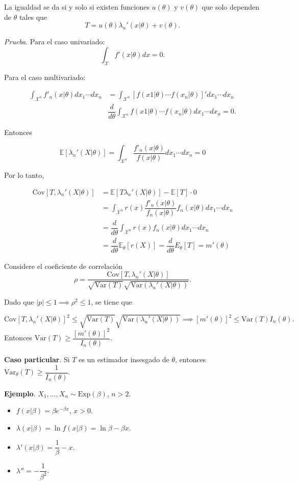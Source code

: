 \documentclass[
  12pt,
]{book}
\begin{document}
La igualdad se da si y solo si existen funciones \(u(\theta)\) y \(v(\theta)\) que solo dependen de \(\theta\) tales que
\[T = u(\theta)\lambda_n'(x|\theta) + v(\theta).\]

\emph{Prueba}. Para el caso univariado:
\[\int_{\mathcal X}f'(x|\theta)dx = 0.\]

Para el caso multivariado:

\begin{align*}
\int_{\mathcal X^n}f'_n(x|\theta)dx_1\cdots dx_n & =\int_{\mathcal X^n}[f(x1|\theta)\cdots f(x_n|\theta)]'dx_1\cdots dx_n \\
& \dfrac d{d\theta} \int_{\mathcal X^n}f(x1|\theta)\cdots f(x_n|\theta)dx_1\cdots dx_n = 0.
\end{align*}

Entonces

\[\mathbb E[\lambda_n'(X|\theta)] = \int_{\mathcal X^n}\dfrac{f'_n(x|\theta)}{f(x|\theta)}dx_1\cdots dx_n = 0\]

Por lo tanto,

\begin{align*}
\text{Cov}[T,\lambda_n'(X|\theta)] & = \mathbb E [T\lambda_n'(X|\theta)] - \mathbb E[T]\cdot 0\\
& =\int_{\mathcal X^n}r(x)\dfrac{f'_n(x|\theta)}{f_n(x|\theta)}f_n(x|\theta)dx_1\cdots dx_n\\
& =  \dfrac d{d\theta}\int_{\mathcal X^n}r(x)f_n(x|\theta)dx_1\cdots dx_n\\
& = \dfrac{d}{d\theta}\mathbb E_\theta[r(X)] = \dfrac{d}{d\theta}E_\theta[T] = m'(\theta)
\end{align*}

Considere el coeficiente de correlación
\[\rho = \dfrac{\text{Cov}[T,\lambda_n'(X|\theta)] }{\sqrt{\text{Var}(T)}\sqrt{\text{Var}(\lambda_n'(X|\theta))}}.\]

Dado que \(|p|\leq 1 \implies \rho^2 \leq 1\), se tiene que

\[\text{Cov}[T,\lambda_n'(X|\theta)]^2 \leq \sqrt{\text{Var}(T)}\sqrt{\text{Var}(\lambda_n'(X|\theta))} \implies [m'(\theta)]^2 \leq \text{Var}(T) I_n(\theta). \]
Entonces \(\text{Var}(T)\geq \dfrac{[m'(\theta)]^2 }{I_n(\theta)}\).

\textbf{Caso particular}. Si \(T\) es un estimador insesgado de \(\theta\), entonces \(\text{Var}_\theta(T)\geq \dfrac{1 }{I_n(\theta)}\).

\textbf{Ejemplo}. \(X_1,\dots, X_n \sim \text{Exp}(\beta)\), \(n>2\).

\begin{itemize}
\item
  \(f(x|\beta) = \beta e^{-\beta x}\), \(x>0\).
\item
  \(\lambda(x|\beta) = \ln f(x|\beta) = \ln \beta -\beta x\).
\item
  \(\lambda'(x|\beta) = \dfrac 1\beta -x.\)
\item
  \(\lambda'' = -\dfrac 1{\beta^2}\).
\end{itemize}
\end{document}
